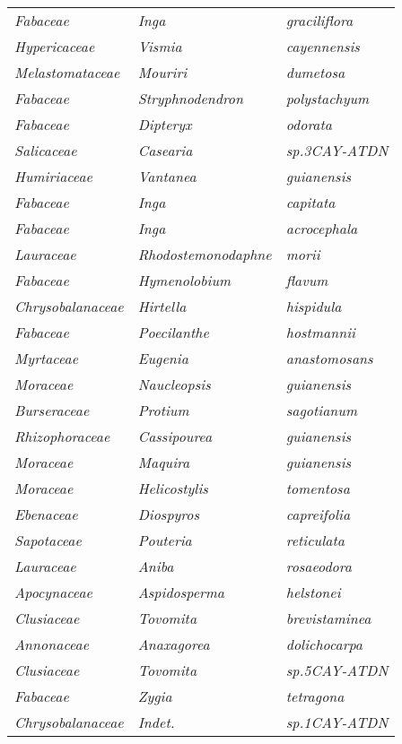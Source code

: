 \documentclass[fleqn,10pt]{ArtEcoFoG} %
\renewenvironment{table}{\begin{table*}}{\end{table*}\ignorespacesafterend}
\begin{document}
\begin{table}
\begin{tabular}[t]{lll}
\em{Fabaceae} & \em{Inga} & \em{graciliflora}\\
\addlinespace
\em{Hypericaceae} & \em{Vismia} & \em{cayennensis}\\
\em{Melastomataceae} & \em{Mouriri} & \em{dumetosa}\\
\em{Fabaceae} & \em{Stryphnodendron} & \em{polystachyum}\\
\em{Fabaceae} & \em{Dipteryx} & \em{odorata}\\
\em{Salicaceae} & \em{Casearia} & \em{sp.3CAY-ATDN}\\
\addlinespace
\em{Humiriaceae} & \em{Vantanea} & \em{guianensis}\\
\em{Fabaceae} & \em{Inga} & \em{capitata}\\
\em{Fabaceae} & \em{Inga} & \em{acrocephala}\\
\em{Lauraceae} & \em{Rhodostemonodaphne} & \em{morii}\\
\em{Fabaceae} & \em{Hymenolobium} & \em{flavum}\\
\addlinespace
\em{Chrysobalanaceae} & \em{Hirtella} & \em{hispidula}\\
\em{Fabaceae} & \em{Poecilanthe} & \em{hostmannii}\\
\em{Myrtaceae} & \em{Eugenia} & \em{anastomosans}\\
\em{Moraceae} & \em{Naucleopsis} & \em{guianensis}\\
\em{Burseraceae} & \em{Protium} & \em{sagotianum}\\
\addlinespace
\em{Rhizophoraceae} & \em{Cassipourea} & \em{guianensis}\\
\em{Moraceae} & \em{Maquira} & \em{guianensis}\\
\em{Moraceae} & \em{Helicostylis} & \em{tomentosa}\\
\em{Ebenaceae} & \em{Diospyros} & \em{capreifolia}\\
\em{Sapotaceae} & \em{Pouteria} & \em{reticulata}\\
\addlinespace
\em{Lauraceae} & \em{Aniba} & \em{rosaeodora}\\
\em{Apocynaceae} & \em{Aspidosperma} & \em{helstonei}\\
\em{Clusiaceae} & \em{Tovomita} & \em{brevistaminea}\\
\em{Annonaceae} & \em{Anaxagorea} & \em{dolichocarpa}\\
\em{Clusiaceae} & \em{Tovomita} & \em{sp.5CAY-ATDN}\\
\addlinespace
\em{Fabaceae} & \em{Zygia} & \em{tetragona}\\
\em{Chrysobalanaceae} & \em{Indet.} & \em{sp.1CAY-ATDN}\\

\end{tabular}
\end{table}
\end{document}
